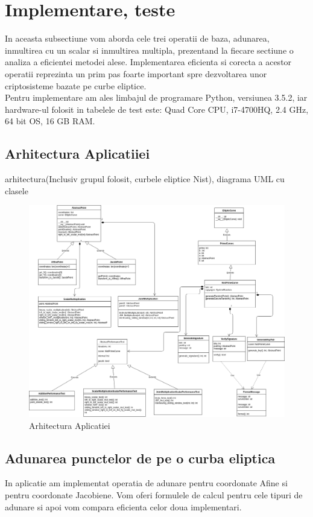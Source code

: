 \chapter{Implementare, teste}

In aceasta subsectiune vom aborda cele trei operatii de baza, adunarea, inmultirea cu un scalar si inmultirea multipla, prezentand la fiecare sectiune o analiza a eficientei metodei alese. Implementarea eficienta si corecta a acestor operatii reprezinta un prim pas foarte important spre dezvoltarea unor criptosisteme bazate pe curbe eliptice.
\\ Pentru implementare am ales limbajul de programare Python, versiunea 3.5.2, iar hardware-ul folosit in tabelele de test este: Quad Core CPU, i7-4700HQ, 2.4 GHz, 64 bit OS, 16 GB RAM.
 

\section{Arhitectura Aplicatiiei}
arhitectura(Inclusiv grupul folosit, curbele eliptice Nist), diagrama UML cu clasele

\begin{figure}[htp]
\centering
\includegraphics[width=17.5cm]{chapters/Arhitectura.png}
\caption{Arhitectura Aplicatiei}
\label{fig:lion}
\end{figure}

\section{Adunarea punctelor de pe o curba eliptica}
\label{subsec:subsec02}
In aplicatie am implementat operatia de adunare pentru coordonate Afine si pentru coordonate Jacobiene. Vom oferi formulele de calcul pentru cele tipuri de adunare si apoi vom compara eficienta celor doua implementari.


